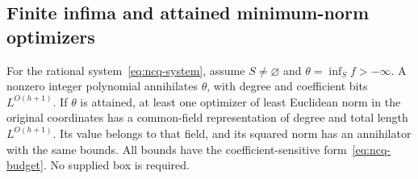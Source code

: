 \subsection{Finite infima and attained minimum-norm optimizers}
\label{app:ncq-infimum}

\begin{theorem}
\label{thm:ncq-infimum}
For the rational system~\eqref{eq:ncq-system}, assume $S\ne\varnothing$
and $\theta=\inf_Sf> -\infty$. A nonzero integer polynomial annihilates
$\theta$, with degree and coefficient bits $L^{O(h+1)}$.
If $\theta$ is attained, at least one optimizer of least Euclidean norm
in the original coordinates has a common-field representation of degree
and total length $L^{O(h+1)}$. Its value belongs to that field, and its
squared norm has an annihilator with the same bounds. All bounds have the
coefficient-sensitive form~\eqref{eq:ncq-budget}. No supplied box is
required.
\end{theorem}


